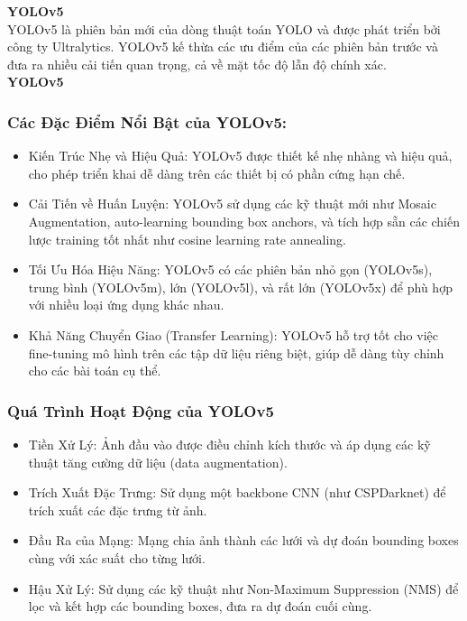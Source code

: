 \begin{flushleft}
    \textbf{YOLOv5}\\
    YOLOv5 là phiên bản mới của dòng thuật toán YOLO và được phát triển bởi công ty Ultralytics. YOLOv5 kế thừa các ưu điểm của các phiên bản trước và đưa ra nhiều cải tiến quan trọng, cả về mặt tốc độ lẫn độ chính xác.\\
    \textbf{YOLOv5}\\
    \fontsize{13}{20}\selectfont\subsubsection{Các Đặc Điểm Nổi Bật của YOLOv5:}
    \begin{itemize}
        \item Kiến Trúc Nhẹ và Hiệu Quả: YOLOv5 được thiết kế nhẹ nhàng và hiệu quả, cho phép triển khai dễ dàng trên các thiết bị có phần cứng hạn chế.
        \item Cải Tiến về Huấn Luyện: YOLOv5 sử dụng các kỹ thuật mới như Mosaic Augmentation, auto-learning bounding box anchors, và tích hợp sẵn các chiến lược training tốt nhất như cosine learning rate annealing.
        \item Tối Ưu Hóa Hiệu Năng: YOLOv5 có các phiên bản nhỏ gọn (YOLOv5s), trung bình (YOLOv5m), lớn (YOLOv5l), và rất lớn (YOLOv5x) để phù hợp với nhiều loại ứng dụng khác nhau.
        \item Khả Năng Chuyển Giao (Transfer Learning): YOLOv5 hỗ trợ tốt cho việc fine-tuning mô hình trên các tập dữ liệu riêng biệt, giúp dễ dàng tùy chỉnh cho các bài toán cụ thể.
    \end{itemize}
    \fontsize{13}{20}\selectfont\subsubsection{Quá Trình Hoạt Động của YOLOv5}
    \begin{itemize}
        \item Tiền Xử Lý: Ảnh đầu vào được điều chỉnh kích thước và áp dụng các kỹ thuật tăng cường dữ liệu (data augmentation).
        \item Trích Xuất Đặc Trưng: Sử dụng một backbone CNN (như CSPDarknet) để trích xuất các đặc trưng từ ảnh.
        \item Đầu Ra của Mạng: Mạng chia ảnh thành các lưới và dự đoán bounding boxes cùng với xác suất cho từng lưới.
        \item Hậu Xử Lý: Sử dụng các kỹ thuật như Non-Maximum Suppression (NMS) để lọc và kết hợp các bounding boxes, đưa ra dự đoán cuối cùng.

\end{itemize}
\end{flushleft}
